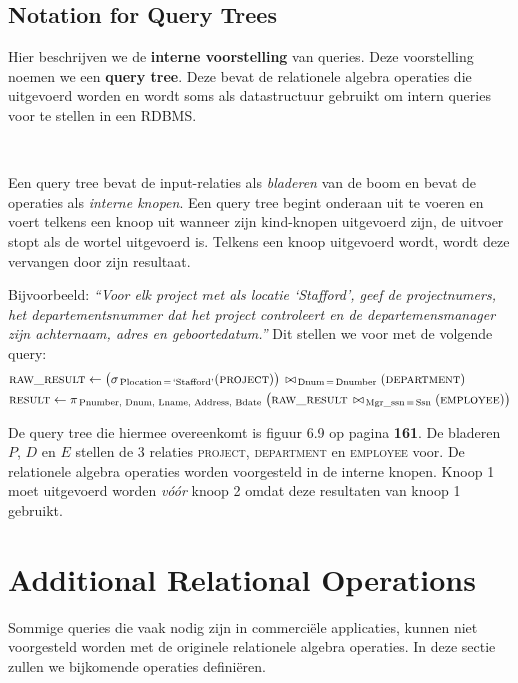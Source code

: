 \subsection{Notation for Query Trees}
Hier beschrijven we de \textbf{interne voorstelling} van queries. Deze voorstelling noemen we een \textbf{query tree}. Deze bevat de relationele algebra operaties die uitgevoerd worden en wordt soms als datastructuur gebruikt om intern queries voor te stellen in  een RDBMS.

~

\noindent Een query tree bevat de input-relaties als \textit{bladeren} van de boom en bevat de operaties als \textit{interne knopen}. Een query tree begint onderaan uit te voeren en voert telkens een knoop uit wanneer zijn kind-knopen uitgevoerd zijn, de uitvoer stopt als de wortel uitgevoerd is. Telkens een knoop uitgevoerd wordt, wordt deze vervangen door zijn resultaat.

Bijvoorbeeld: \textit{``Voor elk project met als locatie `Stafford', geef de projectnumers, het departementsnummer dat het project controleert en de departemensmanager zijn achternaam, adres en geboortedatum.''} Dit stellen we voor met de volgende query:
\vspace{-2mm}
\begin{align*}
& \textsc{raw\_result} \leftarrow \big( \sigma_{\,\text{Plocation} \,=\, \text{`Stafford'}}(\textsc{project}) \big) \,\bowtie_{\,\text{Dnum} \,=\, \text{Dnumber}} (\textsc{department}) \\
& \textsc{result} \leftarrow \pi_{\,\text{Pnumber, Dnum, Lname, Address, Bdate}} \; \big( \textsc{raw\_result} \,\bowtie_{\,\text{Mgr\_ssn} \,=\, \text{Ssn}} (\textsc{employee}) \big)
\end{align*}

\noindent De query tree die hiermee overeenkomt is figuur 6.9 op pagina \textbf{161}. De bladeren $P$, $D$ en $E$ stellen de 3 relaties \textsc{project}, \textsc{department} en \textsc{employee} voor. De relationele algebra operaties worden voorgesteld in de interne knopen. Knoop 1 moet uitgevoerd worden \textit{v\'o\'or} knoop 2 omdat deze resultaten van knoop 1 gebruikt.



\section{Additional Relational Operations}
Sommige queries die vaak nodig zijn in commerci\"ele applicaties, kunnen niet voorgesteld worden met de originele relationele algebra operaties. In deze sectie zullen we bijkomende operaties defini\"eren.


